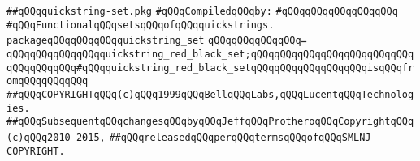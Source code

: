 \label{src/lib/src/quickstring-set.pkg}
\verb|##qQQqquickstring-set.pkg|\newline
\newline
\verb|#qQQqCompiledqQQqby:|\newline
\verb|#qQQqqQQqqQQqqQQqqQQq|\newline
\newline
\verb|#qQQqFunctionalqQQqsetsqQQqofqQQqquickstrings.|\newline
\newline
\verb|packageqQQqqQQqqQQqquickstring_set|\newline
\verb|qQQqqQQqqQQqqQQq=|\newline
\verb|qQQqqQQqqQQqqQQqquickstring_red_black_set;qQQqqQQqqQQqqQQqqQQqqQQqqQQqqQQqqQQqqQQq#qQQqquickstring_red_black_setqQQqqQQqqQQqqQQqqQQqisqQQqfromqQQqqQQqqQQq|\newline
\newline
\newline
\verb|##qQQqCOPYRIGHTqQQq(c)qQQq1999qQQqBellqQQqLabs,qQQqLucentqQQqTechnologies.|\newline
\verb|##qQQqSubsequentqQQqchangesqQQqbyqQQqJeffqQQqProtheroqQQqCopyrightqQQq(c)qQQq2010-2015,|\newline
\verb|##qQQqreleasedqQQqperqQQqtermsqQQqofqQQqSMLNJ-COPYRIGHT.|\newline

